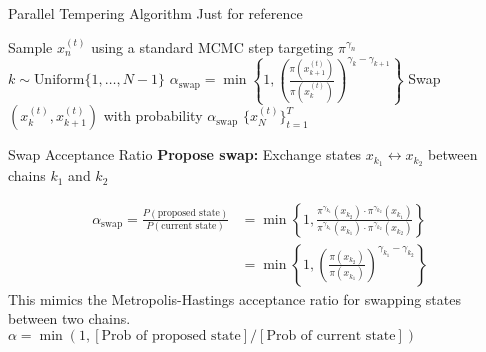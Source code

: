 \begin{frame}{Parallel Tempering Algorithm}
	\textcolor{copenhagenred}{Just for reference}
	\begin{algorithm}[H]
		\caption{Parallel Tempering MCMC}
		\begin{algorithmic}[1]
			\STATE Sample $x_n^{(t)}$ using a standard MCMC step targeting $\pi^{\gamma_n}$
			\ENDFOR
			\STATE $k \sim \text{Uniform}\{1, \ldots, N-1\}$
			\STATE $\alpha_{\text{swap}} = \min\left\{1, \left(\frac{\pi(x_{k+1}^{(t)})}{\pi(x_k^{(t)})}\right)^{\gamma_k - \gamma_{k+1}}\right\}$
			\STATE Swap $(x_k^{(t)}, x_{k+1}^{(t)})$ with probability $\alpha_{\text{swap}}$
			\ENDFOR
			\RETURN $\{x_N^{(t)}\}_{t=1}^T$
		\end{algorithmic}
	\end{algorithm}
\end{frame}

\begin{frame}{Swap Acceptance Ratio}
	\textbf{Propose swap:} Exchange states $x_{k_1} \leftrightarrow x_{k_2}$ between chains $k_1$ and $k_2$

	\begin{align*}
		\alpha_{\text{swap}} = \frac{P(\text{proposed state})}{P(\text{current state})} & = \min\left\{1, \frac{\pi^{\gamma_{k_1}}(x_{k_2}) \cdot \pi^{\gamma_{k_2}}(x_{k_1})}{\pi^{\gamma_{k_1}}(x_{k_1}) \cdot \pi^{\gamma_{k_2}}(x_{k_2})}\right\} \\
		                                                                                & = \min\left\{1, \left(\frac{\pi(x_{k_2})}{\pi(x_{k_1})}\right) ^{\gamma_{k_1} - \gamma_{k_2}}    \right\}
	\end{align*}
	This mimics the Metropolis-Hastings acceptance ratio for swapping states between two chains. $\alpha = \min(1, [\text{Prob of proposed state}]/[\text{Prob of current state}])$
\end{frame}


